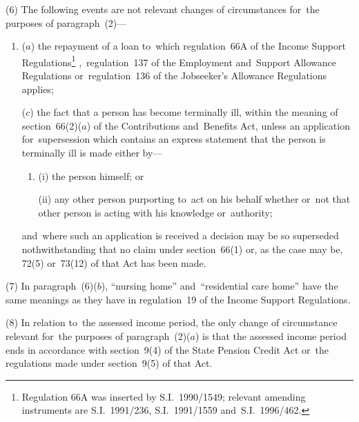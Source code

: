 \documentclass[12pt,a4paper]{article}
\begin{document}
(6) The following events are not relevant changes of circumstances for~the purposes of paragraph~(2)—
\begin{enumerate}\item[]
($a$) the repayment of a loan to~which regulation~66A of the Income Support Regulations\footnote{\frenchspacing Regulation 66A was inserted by S.I.~1990/1549; relevant amending instruments are S.I.~1991/236, S.I.~1991/1559 and~S.I.~1996/462.}%
,~regulation~137 of the Employment and~Support Allowance Regulations  %
or~regulation~136 of the Jobseeker’s Allowance Regulations applies;

%

($c$) the fact that a person has become terminally ill, within the meaning of section~66(2)($a$) of the Contributions and~Benefits Act, unless an application for~supersession which contains an express statement that the person is terminally ill is made either by—
\begin{enumerate}\item[]
(i) the person himself; or

(ii) any other person purporting to~act on his behalf whether or~not that other person is acting with his knowledge or~authority;
\end{enumerate}
and~where such an application is received a decision may be so superseded nothwithstanding that no claim under section~66(1) or, as the case may be, 72(5) or~73(12) of that Act has been made.
\end{enumerate}

(7) In paragraph~(6)($b$), “nursing home” and~“residential care home” have the same meanings as they have in regulation~19 of the Income Support Regulations.

(8) In relation to~the assessed income period, the only change of circumstance relevant for~the purposes of paragraph~(2)($a$)  is that the assessed income period ends in accordance with section~9(4) of the State Pension Credit Act or~the regulations made under section~9(5) of that Act.
\end{document}
